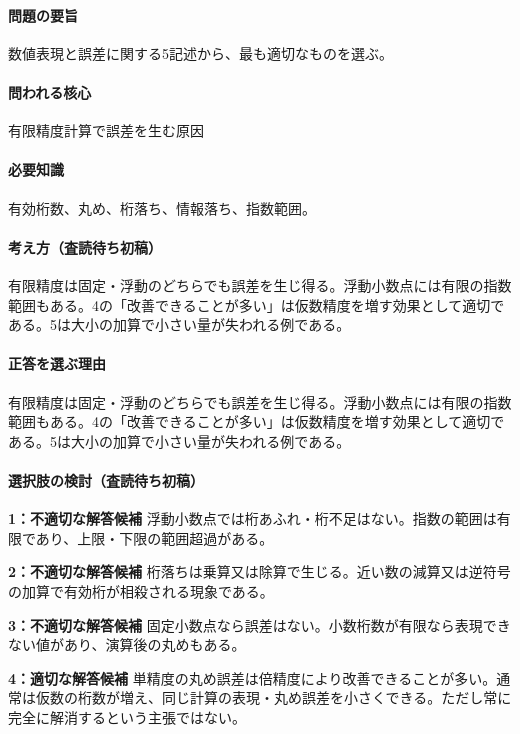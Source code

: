 \paragraph{問題の要旨} 数値表現と誤差に関する5記述から、最も適切なものを選ぶ。

\paragraph{問われる核心} 有限精度計算で誤差を生む原因

\paragraph{必要知識} 有効桁数、丸め、桁落ち、情報落ち、指数範囲。

\paragraph{考え方（査読待ち初稿）} 有限精度は固定・浮動のどちらでも誤差を生じ得る。浮動小数点には有限の指数範囲もある。4の「改善できることが多い」は仮数精度を増す効果として適切である。5は大小の加算で小さい量が失われる例である。

\paragraph{正答を選ぶ理由} 有限精度は固定・浮動のどちらでも誤差を生じ得る。浮動小数点には有限の指数範囲もある。4の「改善できることが多い」は仮数精度を増す効果として適切である。5は大小の加算で小さい量が失われる例である。

\paragraph{選択肢の検討（査読待ち初稿）}

\noindent\textbf{1：不適切な解答候補} 浮動小数点では桁あふれ・桁不足はない。指数の範囲は有限であり、上限・下限の範囲超過がある。\par

\noindent\textbf{2：不適切な解答候補} 桁落ちは乗算又は除算で生じる。近い数の減算又は逆符号の加算で有効桁が相殺される現象である。\par

\noindent\textbf{3：不適切な解答候補} 固定小数点なら誤差はない。小数桁数が有限なら表現できない値があり、演算後の丸めもある。\par

\noindent\textbf{4：適切な解答候補} 単精度の丸め誤差は倍精度により改善できることが多い。通常は仮数の桁数が増え、同じ計算の表現・丸め誤差を小さくできる。ただし常に完全に解消するという主張ではない。\par

